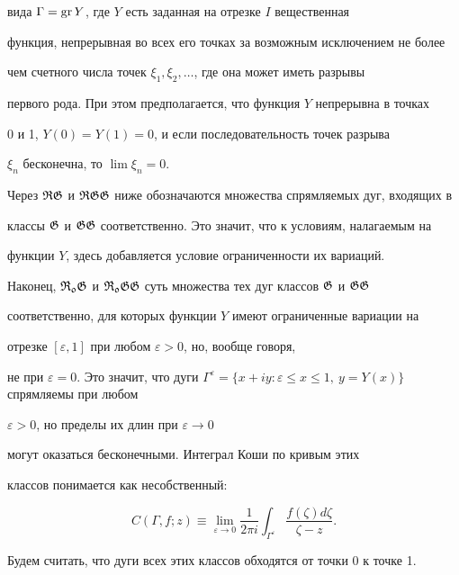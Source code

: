 вида $\Gamma = \operatorname{gr} Y$, где $Y$ есть заданная на отрезке $I$ вещественная


функция, непрерывная во всех его точках за возможным исключением не более


чем счетного числа точек $\xi_1, \xi_2, \dotsc$, где она может иметь разрывы


первого рода. При этом предполагается, что функция $Y$ непрерывна в точках


0 и 1, $Y(0) = Y(1) = 0$, и если последовательность точек разрыва


$\xi_n$ бесконечна, то $\lim\xi_n = 0$.





Через $\operatorname{\frak R\frak G}$ и $\operatorname{\frak R\frak G\frak G}$ ниже обозначаются множества спрямляемых дуг, входящих в


классы $\operatorname{\frak G}$ и $\operatorname{\frak G\frak G}$ соответственно. Это значит, что к условиям, налагаемым на


функции $Y$, здесь добавляется условие ограниченности их вариаций.





Наконец, $\operatorname{\frak {R_{0}G}}$ и $\operatorname{\frak {R_{0}GG}}$ суть множества тех дуг классов $\operatorname{\frak G}$ и $\operatorname{\frak G\frak G}$


соответственно, для которых функции $Y$ имеют ограниченные вариации на


отрезке $[\varepsilon, 1]$ при любом $\varepsilon > 0$, но, вообще говоря,


не при $\varepsilon = 0$. Это значит, что дуги $\Gamma^{\varepsilon} =


\{x+iy: \varepsilon\le x \le 1,\ y = Y(x)\}$ спрямляемы при любом


$\varepsilon > 0$, но пределы их длин при $\varepsilon\to 0$


могут оказаться бесконечными. Интеграл Коши по кривым этих


классов понимается как несобственный:


\begin{equation}


C(\Gamma,f;z) \equiv \lim_{\varepsilon\to 0}


\frac{1}{2\pi i}\int_{\Gamma^\varepsilon}{\frac{f(\zeta)d\zeta}{\zeta-z}}.


\end{equation}





Будем считать, что дуги всех этих классов обходятся от точки 0 к точке 1.


